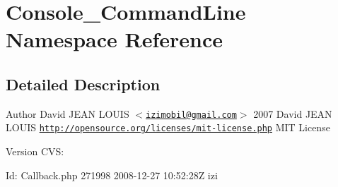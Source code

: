 \hypertarget{namespace_console___command_line}{
\section{Console\_\-CommandLine Namespace Reference}
\label{namespace_console___command_line}
}


\subsection{Detailed Description}
\begin{DoxyAuthor}{Author}
David JEAN LOUIS $<$\href{mailto:izimobil@gmail.com}{\tt izimobil@gmail.com}$>$  2007 David JEAN LOUIS  \href{http://opensource.org/licenses/mit-license.php}{\tt http://opensource.org/licenses/mit-\/license.php} MIT License 
\end{DoxyAuthor}
\begin{DoxyVersion}{Version}
CVS: 
\end{DoxyVersion}
\begin{DoxyParagraph}{Id:}
Callback.php 271998 2008-\/12-\/27 10:52:28Z izi 
\end{DoxyParagraph}
